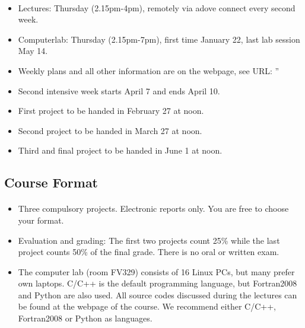 \documentclass[%
twoside,                 %
final,                   %
10pt]{article}
\begin{document}
\paragraph{}
\begin{itemize}
  \item Lectures: Thursday (2.15pm-4pm), remotely via adove connect every second week.

  \item Computerlab: Thursday (2.15pm-7pm), first time January 22, last lab session May 14.

  \item Weekly plans and all other information are on the webpage, see URL: ''

  \item Second intensive week starts April 7 and ends April 10.

  \item First project to be handed in February 27 at noon.

  \item Second project to be handed in March 27 at noon.

  \item Third and final project to be handed in June 1 at noon. 
\end{itemize}

\noindent



\subsection{Course Format}


\paragraph{}
\begin{itemize}
  \item Three  compulsory projects. Electronic reports only. You are free to choose your format.

  \item Evaluation and grading: The first two projects count 25\% while the last project counts 50\% of the final grade. There is no oral or written exam.

  \item The computer lab (room FV329) consists of 16 Linux PCs, but many prefer own laptops. C/C++ is the default programming language, but Fortran2008 and Python are also used. All source codes discussed during the lectures can be found at the webpage of the course. We recommend either C/C++, Fortran2008 or Python as languages.
\end{itemize}
\end{document}
